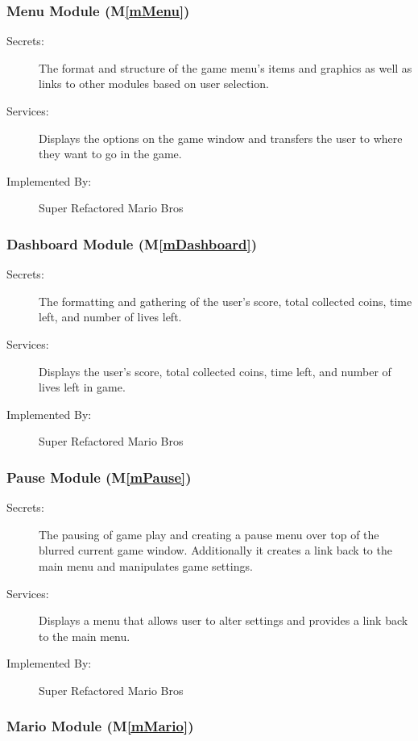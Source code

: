 \documentclass[12pt, titlepage]{article}
\newcommand{\mref}[1]{M\ref{#1}}
\begin{document}
\subsubsection{Menu Module (\mref{mMenu})}

\begin{description}
\item[Secrets:] The format and structure of the game menu's items and graphics as well as links to other modules based on user selection.
\item[Services:] Displays the options on the game window and transfers the user to where they want to go in the game.
\item[Implemented By:] Super Refactored Mario Bros
\end{description}

\subsubsection{Dashboard Module (\mref{mDashboard})}

\begin{description}
\item[Secrets:] The formatting and gathering of the user's score, total collected coins, time left, and number of lives left.
\item[Services:] Displays the user's score, total collected coins, time left, and number of lives left in game.
\item[Implemented By:] Super Refactored Mario Bros
\end{description}

\subsubsection{Pause Module (\mref{mPause})}

\begin{description}
\item[Secrets:] The pausing of game play and creating a pause menu over top of the blurred current game window. Additionally it creates a link back to the main menu and manipulates game settings.
\item[Services:] Displays a menu that allows user to alter settings and provides a link back to the main menu.
\item[Implemented By:] Super Refactored Mario Bros
\end{description}

\subsubsection{Mario Module (\mref{mMario})}
\end{document}

